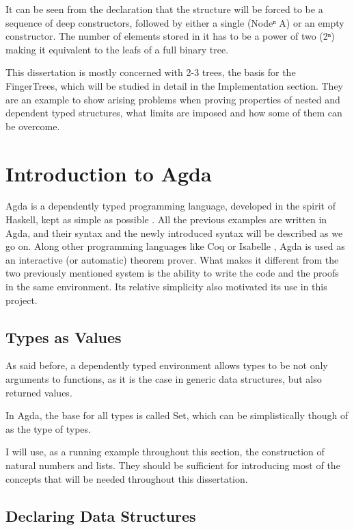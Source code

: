 \documentclass[12pt,twoside,notitlepage]{report}
\begin{document}
It can be seen from the declaration that the structure will be forced to be a sequence of deep
constructors, followed by either a single (Nodeⁿ A) or an empty constructor. The number
of elements stored in it has to be a power of two (2ⁿ) making it equivalent to the leafs of a full
binary tree.

This dissertation is mostly concerned with 2-3 trees, the basis for the FingerTrees, which
will be studied in detail in the Implementation section. They are an example to show arising problems
when proving properties of nested and dependent typed structures, what limits are imposed and how
some of them can be overcome.

\section{Introduction to Agda}

Agda is a dependently typed programming language, developed in the spirit of Haskell, kept as
simple as possible \cite{ulf}.
All the previous examples are written in Agda, and their syntax and the newly introduced syntax
will be described as we go on.
Along other programming languages like Coq \cite{coq} or Isabelle \cite{isabelle}, Agda is used as
an interactive (or automatic) theorem prover. What makes it different from the two previously
mentioned system is the ability to write the code and the proofs in the same environment. Its relative
simplicity also motivated its use in this project.

\subsection{Types as Values}

As said before, a dependently typed environment allows types to be not only arguments to functions,
as it is the case in generic data structures, but also returned values.

In Agda, the base for all types is called Set, which can be simplistically though of as the type of types.

I will use, as a running example throughout this section, the construction of natural numbers and lists. They
should be sufficient for introducing most of the concepts that will be needed throughout this
dissertation.

\subsection{Declaring Data Structures}
\end{document}
